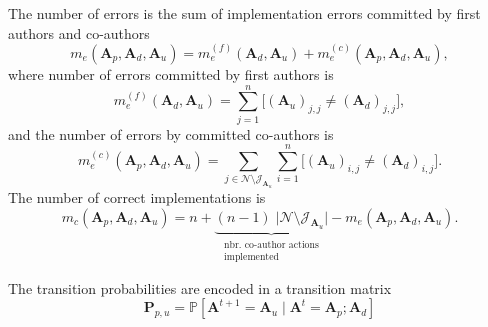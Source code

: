 \documentclass[12pt]{article}
\newcommand{\liver}[0]{\bm{[}}
\newcommand{\river}[0]{\bm{]}}
\begin{document}
The number of errors is the sum of implementation errors committed by first authors
and co-authors
\begin{equation}
    m_e(\boldsymbol{A}_{p}, \boldsymbol{A}_{d}, \boldsymbol{A}_{u}) = 
    m_e^{(f)}(\boldsymbol{A}_{d}, \boldsymbol{A}_{u}) +
    m_e^{(c)}(\boldsymbol{A}_{p}, \boldsymbol{A}_{d}, \boldsymbol{A}_{u}),
\end{equation}
where number of errors committed by first authors is
\begin{equation}
    m_e^{(f)}(\boldsymbol{A}_{d}, \boldsymbol{A}_{u}) =
    \sum_{j = 1}^n \liver (\boldsymbol{A}_{u})_{j, j} \neq (\boldsymbol{A}_{d})_{j, j} \river,
\end{equation}
and the number of errors by committed co-authors is
\begin{equation}
    m_e^{(c)}(\boldsymbol{A}_{p}, \boldsymbol{A}_{d}, \boldsymbol{A}_{u}) =
    \sum_{j \in \mathcal{N} \setminus \mathcal{J}_{\boldsymbol{A}_u}}
    \sum_{i = 1}^n \liver (\boldsymbol{A}_{u})_{i, j} \neq (\boldsymbol{A}_{d})_{i, j} \river.
\end{equation}
The number of correct implementations is
\begin{equation}
    m_c(\boldsymbol{A}_{p}, \boldsymbol{A}_{d}, \boldsymbol{A}_{u}) = 
    n + \underbrace{(n - 1) \; \lvert \mathcal{N} \setminus \mathcal{J}_{\boldsymbol{A}_u} \rvert}_{\substack{\text{nbr. co-author actions}\\\text{implemented}}} 
    - m_e(\boldsymbol{A}_{p}, \boldsymbol{A}_{d}, \boldsymbol{A}_{u}).
\end{equation}

The transition probabilities are encoded in a transition matrix
\begin{equation}
    \boldsymbol{P}_{p, u} = \mathbb{P}[\boldsymbol{A}^{t+1} = \boldsymbol{A}_u 
        \mid \boldsymbol{A}^t = \boldsymbol{A}_p; \boldsymbol{A}_d] 
\end{equation}
\end{document}
